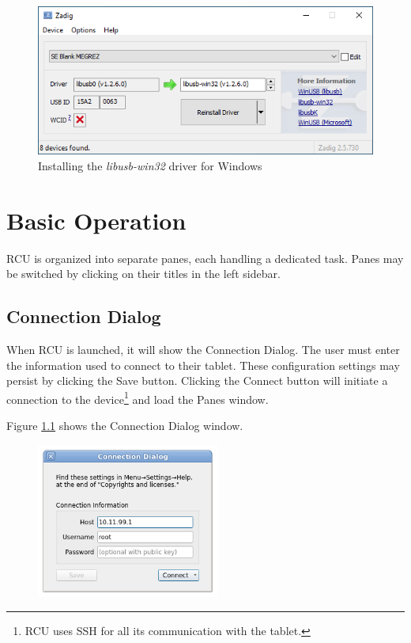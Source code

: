 \documentclass{memoir}
\begin{document}
{\begin{figure}[h]
  \centering
  \includegraphics[width=\linewidth]{images/zadig-windows.png}
  \caption{Installing the \textit{libusb-win32} driver for Windows}
  \label{fig:zadigwindows}
\end{figure}

\vfill







\newpage
\chapter{Basic Operation}
RCU is organized into separate panes, each handling a dedicated task. Panes may be switched by clicking on their titles in the left sidebar.

\section{Connection Dialog}
\label{sec:connectiondialog}
When RCU is launched, it will show the Connection Dialog. The user must enter the information used to connect to their tablet. These configuration settings may persist by clicking the Save button. Clicking the Connect button will initiate a connection to the device\footnote{RCU uses SSH for all its communication with the tablet.} and load the Panes window.

Figure \ref{fig:connectiondialog} shows the Connection Dialog window.

\begin{figure}[h]
  \centering
  \includegraphics[width=6cm]{images/new-connection.png}
  \caption{}
  \label{fig:connectiondialog}
\end{figure}

}
\end{document}

